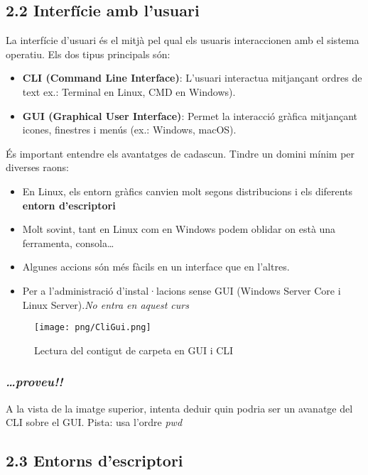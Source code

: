 \documentclass[
  a4paper,
]{article}
\providecommand{\tightlist}{%
  \setlength{\itemsep}{0pt}\setlength{\parskip}{0pt}}
\begin{document}
\subsection{2.2 Interfície amb
l'usuari}\label{interfuxedcie-amb-lusuari}

La interfície d'usuari és el mitjà pel qual els usuaris interaccionen
amb el sistema operatiu. Els dos tipus principals són:

\begin{itemize}
\item
  \textbf{CLI (Command Line Interface)}: L'usuari interactua mitjançant
  ordres de text ex.: Terminal en Linux, CMD en Windows).
\item
  \textbf{GUI (Graphical User Interface)}: Permet la interacció gràfica
  mitjançant icones, finestres i menús (ex.: Windows, macOS).
\end{itemize}

És important entendre els avantatges de cadascun. Tindre un domini mínim
per diverses raons:

\begin{itemize}
\tightlist
\item
  En Linux, els entorn gràfics canvien molt segons distribucions i els
  diferents \textbf{entorn d'escriptori}
\item
  Molt sovint, tant en Linux com en Windows podem oblidar on està una
  ferramenta, consola\ldots{}
\item
  Algunes accions són més fàcils en un interface que en l'altres.
\item
  Per a l'administració d'instal·lacions sense GUI (Windows Server Core
  i Linux Server).\emph{No entra en aquest curs}
\end{itemize}

\begin{figure}
\centering
\texttt{[image: png/CliGui.png]}
\caption{Lectura del contigut de carpeta en GUI i CLI}
\end{figure}

\subsubsection{\texorpdfstring{\textbf{\emph{\ldots proveu!!}}}{\ldots proveu!!}}\label{proveu}

A la vista de la imatge superior, intenta deduir quin podria ser un
avanatge del CLI sobre el GUI. Pista: usa l'ordre \emph{pwd}

\subsection{2.3 Entorns d'escriptori}\label{entorns-descriptori}
\end{document}
